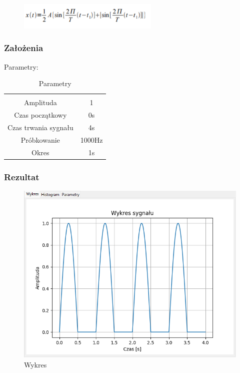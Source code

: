 \documentclass{article}
\begin{document}
\begin{figure}[!htbp]
    \centering
    \includegraphics[width=0.6\textwidth]{img/sinusjedno.png}
\end{figure}
\subsubsection{Założenia}
\noindent
Parametry:
\begin{table}[h!]
    \centering
    \vspace{0.2cm}
    \begin{tabular}{|c|c|}
        \hline\hline\\[-0.4cm]
        Amplituda & 1  \\
        \hline
        Czas początkowy & 0s  \\
        \hline
        Czas trwania sygnału & 4s  \\
        \hline
        Próbkowanie & 1000Hz \\
        \hline
        Okres & 1s\\
        \hline
    \end{tabular}
    \caption{Parametry}
    \label{sinusjednopolowkowy}
\end{table}
\subsubsection{Rezultat}
\begin{figure}[h!]
    \centering
    \includegraphics[width=\textwidth]{img/sinus-jedno/wykres.png}
    \caption{Wykres}
\end{figure}
\end{document}

